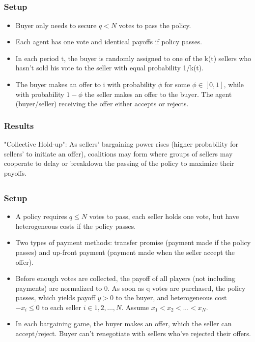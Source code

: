 \documentclass[pdflatex]{beamer}
\begin{document}
\subsection{\cite{InOCoHoldUP}}
\begin{frame}
	\frametitle{Setup}
	\begin{itemize}
		\item Buyer only needs to secure $q < N$ votes to pass the policy. 
		\item Each agent has one vote and identical payoffs if policy passes. 
		\item In each period t, the buyer is randomly assigned to one of the k(t) sellers who hasn't sold his vote to the seller with equal probability 1/k(t).
		\item The buyer makes an offer to i with probability $\phi$ for some $\phi \in [0,1]$, while with probability $1 - \phi$ the seller makes an offer to the buyer. The agent (buyer/seller) receiving the offer either accepts or rejects.
	\end{itemize}
\end{frame}

\begin{frame}
	\frametitle{Results}
	"Collective Hold-up": As sellers' bargaining power rises (higher probability for sellers' to initiate an offer), coalitions may form where groups of sellers may cooperate to delay or breakdown the passing of the policy to maximize their payoffs.
\end{frame}
	
	
\subsection{\cite{CnZSeqVB}}
\begin{frame}
	\frametitle{Setup}
	\begin{itemize}
		\item  A policy requires $q \leq N$ votes to pass, each seller holds one vote, but have heterogeneous costs if the policy passes.
		\item Two types of payment methods: transfer promise (payment made if the policy passes) and up-front payment (payment made when the seller accept the offer).
		\item Before enough votes are collected, the payoff of all players (not including payments) are normalized to 0. As soon as q votes are purchased, the policy passes, which yields payoff $y > 0$ to the buyer, and heterogeneous cost $-x_i \leq 0$ to each seller $i \in {1, 2, ..., N}$. Assume $x_1 < x_2 < ... <x_N$.
		\item In each bargaining game, the buyer makes an offer, which the seller can accept/reject. Buyer can't renegotiate with sellers who've rejected their offers.
	\end{itemize}
\end{frame}
\end{document}
